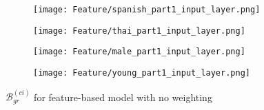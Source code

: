 \begin{figure}[H]
    \centering
    \begin{minipage}{0.23\textwidth}
        \begin{figure}[H]
            \centering
            \texttt{[image: Feature/spanish\_part1\_input\_layer.png]}
        \end{figure}
    \end{minipage}
    \begin{minipage}{0.23\textwidth}
        \begin{figure}[H]
            \centering
            \texttt{[image: Feature/thai\_part1\_input\_layer.png]}
        \end{figure}
    \end{minipage}
    \begin{minipage}{0.23\textwidth}
        \begin{figure}[H]
            \centering
            \texttt{[image: Feature/male\_part1\_input\_layer.png]}
        \end{figure}
    \end{minipage}
    \begin{minipage}{0.23\textwidth}
        \begin{figure}[H]
            \centering
            \texttt{[image: Feature/young\_part1\_input\_layer.png]}
        \end{figure}
    \end{minipage}
    \caption{$\mathcal{B}_{gr}^{(ci)}$ for feature-based model with no weighting}
    \label{fig:grad_feature}
\end{figure}

